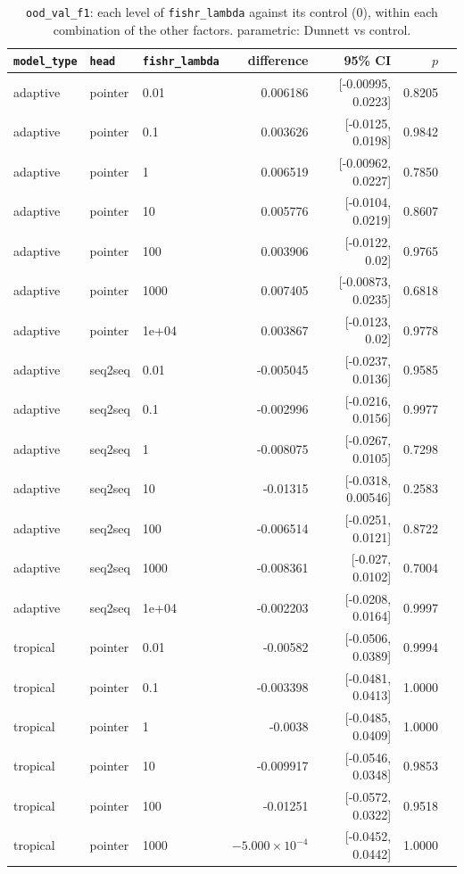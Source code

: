 \documentclass[10pt]{article}
\begin{document}
{\small
\begin{longtable}{lllrrrl}
\caption{\texttt{ood\_val\_f1}: each level of \texttt{fishr\_lambda} against its control (0), within each combination of the other factors. parametric: Dunnett vs control.}\label{tab:control-ood_val_f1}\\
\toprule
\texttt{model\_type} & \texttt{head} & \texttt{fishr\_lambda} & difference & 95\% CI & $p$ & \\
\midrule
\endhead
adaptive & pointer & 0.01 & 0.006186 & [-0.00995, 0.0223] & 0.8205 & \\
adaptive & pointer & 0.1 & 0.003626 & [-0.0125, 0.0198] & 0.9842 & \\
adaptive & pointer & 1 & 0.006519 & [-0.00962, 0.0227] & 0.7850 & \\
adaptive & pointer & 10 & 0.005776 & [-0.0104, 0.0219] & 0.8607 & \\
adaptive & pointer & 100 & 0.003906 & [-0.0122, 0.02] & 0.9765 & \\
adaptive & pointer & 1000 & 0.007405 & [-0.00873, 0.0235] & 0.6818 & \\
adaptive & pointer & 1e+04 & 0.003867 & [-0.0123, 0.02] & 0.9778 & \\
adaptive & seq2seq & 0.01 & -0.005045 & [-0.0237, 0.0136] & 0.9585 & \\
adaptive & seq2seq & 0.1 & -0.002996 & [-0.0216, 0.0156] & 0.9977 & \\
adaptive & seq2seq & 1 & -0.008075 & [-0.0267, 0.0105] & 0.7298 & \\
adaptive & seq2seq & 10 & -0.01315 & [-0.0318, 0.00546] & 0.2583 & \\
adaptive & seq2seq & 100 & -0.006514 & [-0.0251, 0.0121] & 0.8722 & \\
adaptive & seq2seq & 1000 & -0.008361 & [-0.027, 0.0102] & 0.7004 & \\
adaptive & seq2seq & 1e+04 & -0.002203 & [-0.0208, 0.0164] & 0.9997 & \\
tropical & pointer & 0.01 & -0.00582 & [-0.0506, 0.0389] & 0.9994 & \\
tropical & pointer & 0.1 & -0.003398 & [-0.0481, 0.0413] & 1.0000 & \\
tropical & pointer & 1 & -0.0038 & [-0.0485, 0.0409] & 1.0000 & \\
tropical & pointer & 10 & -0.009917 & [-0.0546, 0.0348] & 0.9853 & \\
tropical & pointer & 100 & -0.01251 & [-0.0572, 0.0322] & 0.9518 & \\
tropical & pointer & 1000 & $-5.000\times10^{-4}$ & [-0.0452, 0.0442] & 1.0000 & \\

\end{longtable}}
\end{document}
